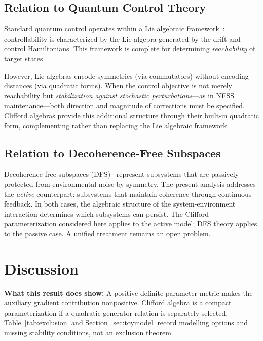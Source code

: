 \documentclass[aps,pre,onecolumn,superscriptaddress,floatfix,longbibliography]{revtex4-2}
\begin{document}
\subsection{Relation to Quantum Control Theory}

Standard quantum control operates within a Lie algebraic framework~\cite{WisemanMilburn2009}: controllability is characterized by the Lie algebra generated by the drift and control Hamiltonians.
This framework is complete for determining \emph{reachability} of target states.

However, Lie algebras encode symmetries (via commutators) without encoding distances (via quadratic forms).
When the control objective is not merely reachability but \emph{stabilization against stochastic perturbations}---as in NESS maintenance---both direction and magnitude of corrections must be specified.
Clifford algebras provide this additional structure through their built-in quadratic form, complementing rather than replacing the Lie algebraic framework.

\subsection{Relation to Decoherence-Free Subspaces}

Decoherence-free subspaces (DFS)~\cite{Zanardi2001,Lidar2003} represent subsystems that are passively protected from environmental noise by symmetry.
The present analysis addresses the \emph{active} counterpart: subsystems that maintain coherence through continuous feedback.
In both cases, the algebraic structure of the system-environment interaction determines which subsystems can persist.
The Clifford parameterization considered here applies to the active model; DFS theory applies to the passive case.
A unified treatment remains an open problem.

\section{Discussion}

\textbf{What this result does show:}
A positive-definite parameter metric makes the auxiliary gradient contribution nonpositive.  Clifford algebra is a compact parameterization if a quadratic generator relation is separately selected.  Table~\ref{tab:exclusion} and Section~\ref{sec:toymodel} record modelling options and missing stability conditions, not an exclusion theorem.
\end{document}
